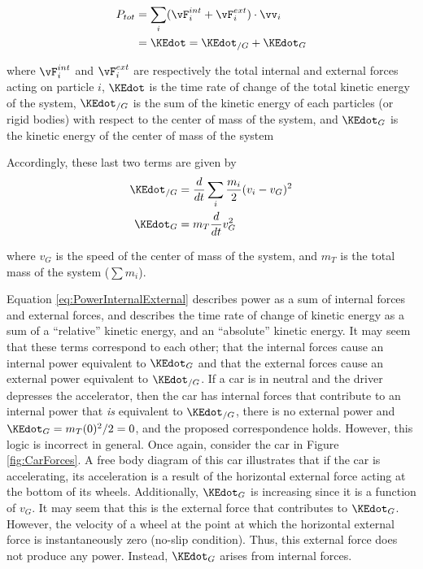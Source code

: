 \begin{align}
P_{tot} &= \sum_i (\vF_{i}^{int} + \vF_{i}^{ext}) \cdot \vv_{i} \\
&= \KEdot = \KEdot_{/G} + \KEdot_{G}
\label{eq:PowerInternalExternal}
\end{align}

where $\vF_i^{int}$ and $\vF_i^{ext}$ are respectively the total internal and external forces acting on particle $i$, $\KEdot$ is the time rate of change of the total kinetic energy of the system, $\KEdot_{/G}$ is the sum of the kinetic energy of each particles (or rigid bodies) with respect to the center of mass of the system, and $\KEdot_{G}$ is the kinetic energy of the center of mass of the system

Accordingly, these last two terms are given by 
\begin{align}
\KEdot_{/G} &= \frac{d}{dt} \sum_{i} \frac{m_i}{2}(v_{i} - v_{G})^{2} \\
\KEdot_{G} &= m_{T} \frac{d}{dt} v_{G}^{2}
\end{align}

where $v_{G}$ is the speed of the center of mass of the system, and $m_{T}$ is the total mass of the system ($\sum m_i$).

Equation \ref{eq:PowerInternalExternal} describes power as a sum of internal forces and external forces, and describes the time rate of change of kinetic energy as a sum of a ``relative'' kinetic energy, and an ``absolute'' kinetic energy. It may seem that these terms correspond to each other; that the internal forces cause an internal power equivalent to $\KEdot_{G}$ and that the external forces cause an external power equivalent to $\KEdot_{/G}$. If a car is in neutral and the driver depresses the accelerator, then the car has internal forces that contribute to an internal power that \textit{is} equivalent to $\KEdot_{/G}$, there is no external power and $\KEdot_{G} = m_{T}(0)^2/2 = 0$, and the proposed correspondence holds. However, this logic is incorrect in general. Once again, consider the car in Figure \ref{fig:CarForces}. A free body diagram of this car illustrates that if the car is accelerating, its acceleration is a result of the horizontal external force acting at the bottom of its wheels. Additionally, $\KEdot_{G}$ is increasing since it is a function of $v_{G}$. It may seem that this is the external force that contributes to $\KEdot_{G}$. However, the velocity of a wheel at the point at which the horizontal external force is instantaneously zero (no-slip condition). Thus, this external force does not produce any power. Instead, $\KEdot_{G}$ arises from internal forces.

